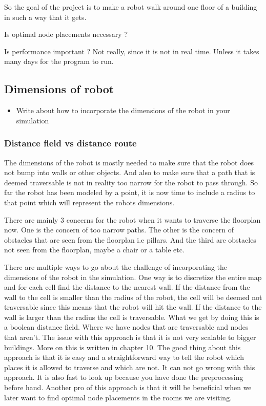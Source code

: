 So the goal of the project is to make a robot walk around one floor of a building in such a way that it gets.

Is optimal node placements necessary ? 

Is performance important ? Not really, since it is not in real time. Unless it takes many days for the program to run.



\subsection{Dimensions of robot}
\begin{itemize}
    \item Write about how to incorporate the dimensions of the robot in your simulation
\end{itemize}


\subsubsection{Distance field vs distance route}
The dimensions of the robot is mostly needed to make sure that the robot does not bump into walls or other objects. And also to make sure that a path that is deemed traversable is not in reality too narrow for the robot to pass through.
So far the robot has been modeled by a point, it is now time to include a radius to that point which will represent the robots dimensions.

There are mainly 3 concerns for the robot when it wants to traverse the floorplan now. One is the concern of too narrow paths. The other is the concern of obstacles that are seen from the floorplan i.e pillars. And the third are obstacles not seen from the floorplan, maybe a chair or a table etc.



There are multiple ways to go about the challenge of incorporating the dimensions of the robot in the simulation. 
One way is to discretize the entire map and for each cell find the distance to the nearest wall. If the distance from the wall to the cell is smaller than the radius of the robot, the cell will be deemed not traversable since this means that the robot will hit the wall. If the distance to the wall is larger than the radius the cell is traversable. What we get by doing this is a boolean distance field. Where we have nodes that are traversable and nodes that aren't.
The issue with this approach is that it is not very scalable to bigger buildings. More on this is written in chapter 10.
The good thing about this approach is that it is easy and a straightforward way to tell the robot which places it is allowed to traverse and which are not. It can not go wrong with this approach. 
It is also fast to look up because you have done the preprocessing before hand.
Another pro of this approach is that it will be beneficial when we later want to find optimal node placements in the rooms we are visiting.

